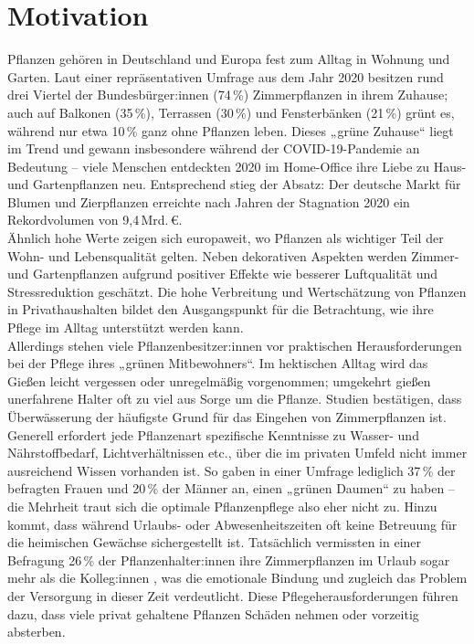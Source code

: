 \section{Motivation}
\label{sec:Motivation}

Pflanzen gehören in Deutschland und Europa fest zum Alltag in Wohnung und Garten. Laut einer repräsentativen Umfrage aus dem Jahr 2020 besitzen rund drei Viertel der Bundesbürger:innen (74\,\%) Zimmerpflanzen in ihrem Zuhause; auch auf Balkonen (35\,\%), Terrassen (30\,\%) und Fensterbänken (21\,\%) grünt es, während nur etwa 10\,\% ganz ohne Pflanzen leben. \autocite{pflanzenbesitz_de} Dieses „grüne Zuhause“ liegt im Trend und gewann insbesondere während der COVID-19-Pandemie an Bedeutung – viele Menschen entdeckten 2020 im Home-Office ihre Liebe zu Haus- und Gartenpflanzen neu. \autocite{gabot_artikel} Entsprechend stieg der Absatz: Der deutsche Markt für Blumen und Zierpflanzen erreichte nach Jahren der Stagnation 2020 ein Rekordvolumen von 9{,}4\,Mrd.\,€. \autocite{gabot_artikel} 
\\
Ähnlich hohe Werte zeigen sich europaweit, wo Pflanzen als wichtiger Teil der Wohn- und Lebensqualität gelten. Neben dekorativen Aspekten werden Zimmer- und Gartenpflanzen aufgrund positiver Effekte wie besserer Luftqualität und Stressreduktion geschätzt. \autocite{pflanzenbesitz_de} Die hohe Verbreitung und Wertschätzung von Pflanzen in Privathaushalten bildet den Ausgangspunkt für die Betrachtung, wie ihre Pflege im Alltag unterstützt werden kann.
\\
Allerdings stehen viele Pflanzenbesitzer:innen vor praktischen Herausforderungen bei der Pflege ihres „grünen Mitbewohners“. Im hektischen Alltag wird das Gießen leicht vergessen oder unregelmäßig vorgenommen; umgekehrt gießen unerfahrene Halter oft zu viel aus Sorge um die Pflanze. Studien bestätigen, dass Überwässerung der häufigste Grund für das Eingehen von Zimmerpflanzen ist. \autocite{pflanzenpflege_fehler} 
\\
Generell erfordert jede Pflanzenart spezifische Kenntnisse zu Wasser- und Nährstoffbedarf, Lichtverhältnissen etc., über die im privaten Umfeld nicht immer ausreichend Wissen vorhanden ist. So gaben in einer Umfrage lediglich 37\,\% der befragten Frauen und 20\,\% der Männer an, einen „grünen Daumen“ zu haben \autocite{pflanzenbesitz_de} – die Mehrheit traut sich die optimale Pflanzenpflege also eher nicht zu. Hinzu kommt, dass während Urlaubs- oder Abwesenheitszeiten oft keine Betreuung für die heimischen Gewächse sichergestellt ist. Tatsächlich vermissten in einer Befragung 26\,\% der Pflanzenhalter:innen ihre Zimmerpflanzen im Urlaub sogar mehr als die Kolleg:innen \autocite{pflanzenbesitz_de}, was die emotionale Bindung und zugleich das Problem der Versorgung in dieser Zeit verdeutlicht. Diese Pflegeherausforderungen führen dazu, dass viele privat gehaltene Pflanzen Schäden nehmen oder vorzeitig absterben.
